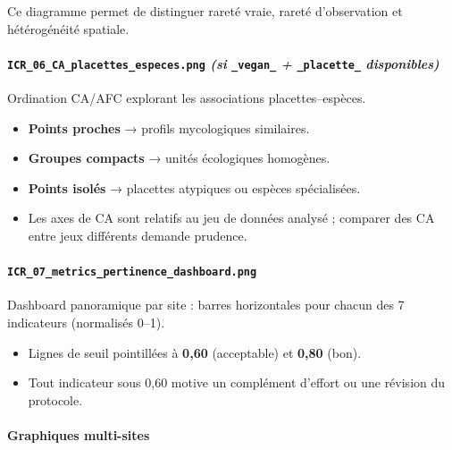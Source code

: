 Ce diagramme permet de distinguer rareté vraie, rareté d'observation et
hétérogénéité spatiale.

\paragraph{\texorpdfstring{\texttt{ICR\_06\_CA\_placettes\_especes.png}
\emph{(si} \texttt{\_vegan\_} \emph{+} \texttt{\_placette\_}
\emph{disponibles)}}{ICR\_06\_CA\_placettes\_especes.png (si \_vegan\_ + \_placette\_ disponibles)}}\label{icr_06_ca_placettes_especes.png-si-_vegan_-_placette_-disponibles}

Ordination CA/AFC explorant les associations placettes--espèces.

\begin{itemize}
\tightlist
\item
  \textbf{Points proches} → profils mycologiques similaires.
\item
  \textbf{Groupes compacts} → unités écologiques homogènes.
\item
  \textbf{Points isolés} → placettes atypiques ou espèces spécialisées.
\item
  Les axes de CA sont relatifs au jeu de données analysé ; comparer des
  CA entre jeux différents demande prudence.
\end{itemize}

\paragraph{\texorpdfstring{\texttt{ICR\_07\_metrics\_pertinence\_dashboard.png}}{ICR\_07\_metrics\_pertinence\_dashboard.png}}\label{icr_07_metrics_pertinence_dashboard.png}

Dashboard panoramique par site : barres horizontales pour chacun des 7
indicateurs (normalisés 0--1).

\begin{itemize}
\tightlist
\item
  Lignes de seuil pointillées à \textbf{0,60} (acceptable) et
  \textbf{0,80} (bon).
\item
  Tout indicateur sous 0,60 motive un complément d'effort ou une
  révision du protocole.
\end{itemize}

\paragraph{Graphiques multi-sites}\label{graphiques-multi-sites}

